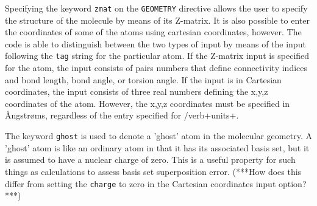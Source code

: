 Specifying the keyword \verb+zmat+ on the \verb+GEOMETRY+ directive allows
the user to specify the structure of the molecule by means of its Z-matrix.
It is also possible to enter the coordinates of some of the atoms using
cartesian coordinates, however.  The code is able to distinguish between
the two types of input by means of the input following the \verb+tag+ string
for the particular atom.  If the Z-matrix input is specified for the atom,
the input consists of pairs numbers that define connectivity indices and 
bond length, bond angle, or torsion angle.  If the
input is in Cartesian coordinates, the input consists of three real numbers
defining the x,y,z coordinates of the atom.  However, the x,y,z coordinates
must be specified in {\AA}ngstr{\o}ms, regardless of the entry specified
for /verb+units+.

The keyword \verb+ghost+ is used to denote a 'ghost' atom in the molecular
geometry.  A 'ghost' atom is like an ordinary atom in that it has its 
associated basis set, but it is assumed to have a nuclear charge of zero.
This is a useful property for such things as calculations to assess basis set
superposition error.  (***How does this differ from setting the \verb+charge+
to zero in the Cartesian coordinates input option?***)

% 
% 
%

